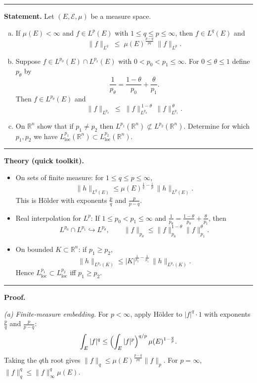 \documentclass[12pt,a4paper]{article}
\theoremstyle{plain}
\theoremstyle{definition}
\theoremstyle{remark}
\theoremstyle{remark}
\newcommand{\tighthrule}{\vspace{0.6\baselineskip}\hrule\vspace{0.8\baselineskip}}
\newenvironment{spacy}{\begingroup\setlength{\parskip}{6pt}\setlength{\parindent}{0pt}}{\endgroup}
\theoremstyle{definition}
\begin{document}
\tighthrule
\begin{spacy}
	\textbf{Statement.}
	Let $(E,\mathcal E,\mu)$ be a measure space.
	\begin{enumerate}[(a)]
		\item If $\mu(E)<\infty$ and $f\in L^{p}(E)$ with $1\le q\le p\le\infty$, then $f\in L^{q}(E)$ and
		\[
		\|f\|_{L^{q}} \;\le\; \mu(E)^{\frac{p-q}{pq}}\;\|f\|_{L^{p}}.
		\]
		\item Suppose $f\in L^{p_{0}}(E)\cap L^{p_{1}}(E)$ with $0<p_{0}<p_{1}\le\infty$.
		For $0\le \theta\le 1$ define $p_{\theta}$ by
		\[
		\frac{1}{p_{\theta}}=\frac{1-\theta}{p_{0}}+\frac{\theta}{p_{1}}.
		\]
		Then $f\in L^{p_{\theta}}(E)$ and
		\[
		\|f\|_{L^{p_{\theta}}} \;\le\; \|f\|_{L^{p_{0}}}^{\,1-\theta}\,\|f\|_{L^{p_{1}}}^{\,\theta}.
		\]
		\item On $\mathbb R^{n}$ show that if $p_{1}\neq p_{2}$ then
		$L^{p_{1}}(\mathbb R^{n})\not\subset L^{p_{2}}(\mathbb R^{n})$.
		Determine for which $p_{1},p_{2}$ we have
		$L^{p_{1}}_{\mathrm{loc}}(\mathbb R^{n}) \subset L^{p_{2}}_{\mathrm{loc}}(\mathbb R^{n})$.
	\end{enumerate}
	
	\tighthrule
	
	\textbf{Theory (quick toolkit).}
	\begin{itemize}
		\item On sets of finite measure: for $1\le q\le p\le\infty$,
		\[
		\|h\|_{L^{q}(E)} \le \mu(E)^{\frac{1}{q}-\frac{1}{p}}\,\|h\|_{L^{p}(E)}.
		\]
		This is Hölder with exponents $\frac{p}{q}$ and $\frac{p}{p-q}$.
		\item Real interpolation for $L^p$:
		If $1\le p_{0}<p_{1}\le\infty$ and $\frac1{p_{\theta}}=\frac{1-\theta}{p_{0}}+\frac{\theta}{p_{1}}$, then
		\[
		L^{p_{0}}\cap L^{p_{1}} \hookrightarrow L^{p_{\theta}},\qquad
		\|f\|_{p_{\theta}}\le \|f\|_{p_{0}}^{1-\theta}\|f\|_{p_{1}}^{\theta}.
		\]
		\item On bounded $K\subset\mathbb R^{n}$: if $p_{1}\ge p_{2}$,
		\[
		\|h\|_{L^{p_{2}}(K)} \le |K|^{\frac1{p_{2}}-\frac1{p_{1}}}\,\|h\|_{L^{p_{1}}(K)}.
		\]
		Hence $L^{p_{1}}_{\mathrm{loc}}\subset L^{p_{2}}_{\mathrm{loc}}$ iff $p_{1}\ge p_{2}$.
	\end{itemize}
	
	\tighthrule
	
	\textbf{Proof.}
	
	\emph{(a) Finite-measure embedding.}
	For $p<\infty$, apply Hölder to $|f|^{q}\cdot 1$ with exponents $\tfrac{p}{q}$ and $\tfrac{p}{p-q}$:
	\[
	\int_E |f|^{q}
	\le \Bigl(\int_E |f|^{p}\Bigr)^{q/p}\,\mu(E)^{1-\frac{q}{p}}.
	\]
	Taking the $q$th root gives
	$\|f\|_{q}\le \mu(E)^{\frac{p-q}{pq}}\|f\|_{p}$.
	For $p=\infty$, $\|f\|_{q}^{q}\le \|f\|_{\infty}^{q}\mu(E)$.
	

\end{spacy}
\end{document}
